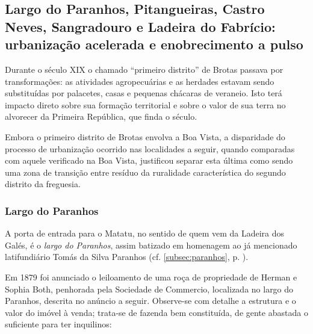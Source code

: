 \subsection{Largo do Paranhos, Pitangueiras, Castro Neves, Sangradouro e Ladeira do Fabrício: urbanização acelerada e enobrecimento a pulso}\label{subsec:pitangueiras}

Durante o século XIX o chamado ``primeiro distrito'' de Brotas passava por transformações: as atividades agropecuárias e as herdades estavam sendo substituídas por palacetes, casas e pequenas chácaras de veraneio. Isto terá impacto direto sobre sua formação territorial e sobre o valor de sua terra no alvorecer da Primeira República, que finda o século. 

Embora o primeiro distrito de Brotas envolva a Boa Vista, a disparidade do processo de urbanização ocorrido nas localidades a seguir, quando comparadas com aquele verificado na Boa Vista, justificou separar esta última como sendo uma zona de transição entre  resíduo da ruralidade característica do segundo distrito da freguesia.

\subsubsection{Largo do Paranhos}\label{subsubsec:paranhos}

A porta de entrada para o Matatu, no sentido de quem vem da Ladeira dos Galés, é o \textit{largo do Paranhos}, assim batizado em homenagem ao já mencionado latifundiário Tomás da Silva Paranhos (cf. \autoref{subsec:paranhos}, p. \pageref{subsec:paranhos}).

Em 1879 foi anunciado o leiloamento de uma roça de propriedade de Herman e Sophia Both, penhorada pela Sociedade de Commercio, localizada no largo do Paranhos, descrita no anúncio a seguir. Observe-se com detalhe a estrutura e o valor do imóvel à venda; trata-se de fazenda bem constituída, de gente abastada o suficiente para ter inquilinos:


